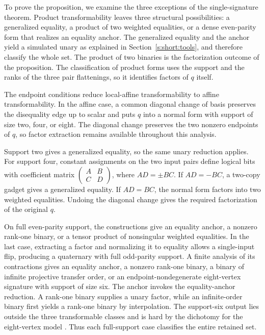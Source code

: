 \documentclass[11pt,letterpaper,onecolumn]{article}
\theoremstyle{plain}
\theoremstyle{definition}
\theoremstyle{remark}
\begin{document}
To prove the proposition, we examine the three exceptions of the
single-signature theorem. Product transformability
leaves three structural possibilities: a generalized equality, a product
of two weighted equalities, or a dense even-parity form that realizes an
equality anchor. The generalized equality and the anchor yield a simulated unary as
explained in Section~\ref{s:short:tools}, and therefore classify the whole set. The product of two binaries
is the factorization outcome of the proposition. The classification of product forms uses the
support and the ranks of the three pair flattenings, so it identifies
factors of \(q\) itself.

The endpoint conditions reduce local-affine transformability to affine
transformability. In the affine case, a common diagonal change of basis
preserves the disequality edge up to scalar and puts \(q\) into a normal
form with support of size two, four, or eight. The diagonal change
preserves the two nonzero endpoints of \(q\), so factor extraction
remains available throughout this analysis.

Support two gives a generalized equality, so the same unary reduction
applies. For support four, constant assignments on the two input pairs
define logical bits with
coefficient matrix \(\left(\begin{smallmatrix}A&B\\C&D\end{smallmatrix}\right)\),
where \(AD=\pm BC\). If \(AD=-BC\), a two-copy gadget gives a generalized
equality. If \(AD=BC\), the normal form factors into two weighted
equalities. Undoing the diagonal change gives the required factorization
of the original \(q\).

On full even-parity support, the constructions give an equality anchor,
a nonzero rank-one binary, or a tensor product of nonsingular weighted equalities.
In the last case, extracting a factor and normalizing it to equality
allows a single-input flip, producing a quaternary with full odd-parity
support. A finite analysis of its contractions gives an equality anchor,
a nonzero rank-one binary, a binary of infinite projective transfer order,
or an endpoint-nondegenerate eight-vertex signature with support of size six.
The anchor invokes the equality-anchor reduction. A rank-one binary
supplies a unary factor, while an infinite-order binary first yields a
rank-one binary by interpolation. The support-six output lies outside
the three transformable classes and is hard by the dichotomy for the
eight-vertex model \cite[arXiv version~2, Theorem~3.1]{CaiFu2023}.
Thus each full-support case classifies the entire retained set.
\end{document}
